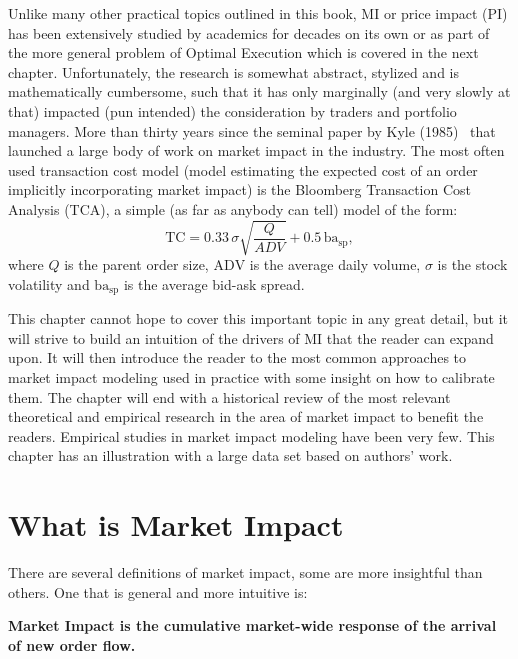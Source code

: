 Unlike many other practical topics outlined in this book, MI or price impact (PI) has been extensively studied by academics for decades on its own or as part of the more general problem of Optimal Execution which is covered in the next chapter. Unfortunately, the research is somewhat abstract, stylized and is mathematically cumbersome, such that it has only marginally (and very slowly at that) impacted (pun intended) the consideration by traders and portfolio managers. More than thirty years since the seminal paper by Kyle (1985)~\cite{kyle1985} that launched a large body of work on market impact in the industry. The most often used transaction cost model (model estimating the expected cost of an order implicitly incorporating market impact) is the Bloomberg Transaction Cost Analysis (TCA), a simple (as far as anybody can tell) model of the form:
        \begin{equation} \label{eq:bb_tca}
        \text{TC} = 0.33\, \sigma \sqrt{\frac{Q}{ADV}} + 0.5 \,\text{ba}_{\text{sp}},
        \end{equation}
where $Q$ is the parent order size, $\text{ADV}$ is the average daily volume, $\sigma$ is the stock volatility and $\text{ba}_{\text{sp}}$ is the average bid-ask spread. 


This chapter cannot hope to cover this important topic in any great detail, but it will strive to build an intuition of the drivers of MI that the reader can expand upon. It will then introduce the reader to the most common approaches to market impact modeling used in practice with some insight on how to calibrate them. The chapter will end with a historical review of the most relevant theoretical and empirical research in the area of market impact to benefit the readers. Empirical studies in market impact modeling have been very few. This chapter has an illustration with a large data set based on authors' work. 



\section{What is Market Impact\label{sec:what_market_impact}}

There are several definitions of market impact, some are more insightful than others. One that is general and more intuitive is:
        \begin{displayquote}
        \textbf{Market Impact is the cumulative market-wide response of the arrival  of new order flow.}
        \end{displayquote}


